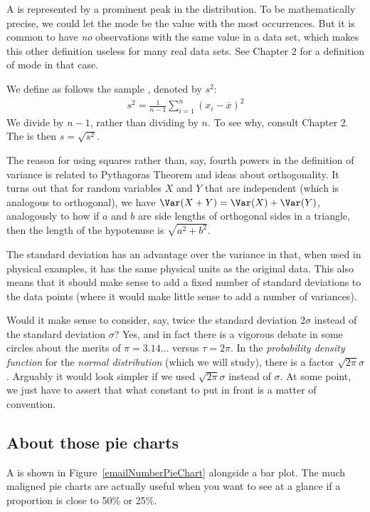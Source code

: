 A  is represented by a prominent peak in the distribution. To be mathematically precise, we could let the mode be the value with the most occurrences. But it is common to have \emph{no} observations with the same value in a data set, which makes this other definition useless for many real data sets. See Chapter 2 for a definition of mode in that case.

\label{variability}

We define as follows the sample \label{varianceIsDefined}, denoted by $s_{}^2$:
\begin{align*}
s_{}^2 = \frac1{n-1}\sum_{i=1}^n (x_i-\overline x)^2
\end{align*}
We divide by $n-1$, rather than dividing by $n$. To see why, consult Chapter 2. The  is then $s=\sqrt{s^2}$.

The reason for using squares rather than, say, fourth powers in the definition of variance is related to Pythagoras Theorem and ideas about orthogonality.
It turns out that for random variables $X$ and $Y$ that are independent (which is analogous to orthogonal), we have $\Var(X+Y)=\Var(X)+\Var(Y)$, analogously to how if $a$ and $b$ are side lengths of orthogonal sides in a triangle, then the length of the hypotenuse is $\sqrt{a^2+b^2}$.

The standard deviation has an advantage over the variance in that, when used in physical examples, it has the same physical units as the original data. This also means that it should make sense to add a fixed number of standard deviations to the data points (where it would make little sense to add a number of variances).

Would it make sense to consider, say, twice the standard deviation $2\sigma$ instead of the standard deviation $\sigma$?
Yes, and in fact there is a vigorous debate in some circles about the merits of $\pi=3.14\dots$ versus $\tau=2\pi$.
In the \emph{probability density function} for the \emph{normal distribution} (which we will study), there is a factor $\sqrt{2\pi}\sigma$.
Arguably it would look simpler if we used $\sqrt{2\pi}\sigma$ instead of $\sigma$.
At some point, we just have to assert that what constant to put in front is a matter of convention.

\subsection{About those pie charts}
A  is shown in Figure~\vref{emailNumberPieChart} alongside a bar plot.
The much maligned pie charts are actually useful when you want to see at a glance if a proportion is close to 50\% or 25\%.

